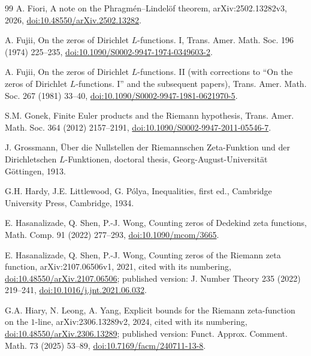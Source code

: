 \documentclass[11pt,a4paper]{article}
\numberwithin{equation}{section}
\theoremstyle{definition}
\theoremstyle{remark}
\begin{document}
\begin{thebibliography}{99}
 A. Fiori, A note on the Phragm\'en--Lindel\"of theorem, arXiv:2502.13282v3, 2026, \href{https://doi.org/10.48550/arXiv.2502.13282}{doi:10.48550/arXiv.2502.13282}.

 A. Fujii, On the zeros of Dirichlet $L$-functions. I, Trans. Amer. Math. Soc. 196 (1974) 225--235, \href{https://doi.org/10.1090/S0002-9947-1974-0349603-2}{doi:10.1090/S0002-9947-1974-0349603-2}.

 A. Fujii, On the zeros of Dirichlet $L$-functions. II (with corrections to ``On the zeros of Dirichlet $L$-functions. I'' and the subsequent papers), Trans. Amer. Math. Soc. 267 (1981) 33--40, \href{https://doi.org/10.1090/S0002-9947-1981-0621970-5}{doi:10.1090/S0002-9947-1981-0621970-5}.

 S.M. Gonek, Finite Euler products and the Riemann hypothesis, Trans. Amer. Math. Soc. 364 (2012) 2157--2191, \href{https://doi.org/10.1090/S0002-9947-2011-05546-7}{doi:10.1090/S0002-9947-2011-05546-7}.

 J. Grossmann, \"Uber die Nullstellen der Riemannschen Zeta-Funktion und der Dirichletschen $L$-Funktionen, doctoral thesis, Georg-August-Universit\"at G\"ottingen, 1913.

 G.H. Hardy, J.E. Littlewood, G. P\'olya, Inequalities, first ed., Cambridge University Press, Cambridge, 1934.

 E. Hasanalizade, Q. Shen, P.-J. Wong, Counting zeros of Dedekind zeta functions, Math. Comp. 91 (2022) 277--293, \href{https://doi.org/10.1090/mcom/3665}{doi:10.1090/mcom/3665}.

 E. Hasanalizade, Q. Shen, P.-J. Wong, Counting zeros of the Riemann zeta function, arXiv:2107.06506v1, 2021, cited with its numbering, \href{https://doi.org/10.48550/arXiv.2107.06506}{doi:10.48550/arXiv.2107.06506}; published version: J. Number Theory 235 (2022) 219--241, \href{https://doi.org/10.1016/j.jnt.2021.06.032}{doi:10.1016/j.jnt.2021.06.032}.

 G.A. Hiary, N. Leong, A. Yang, Explicit bounds for the Riemann zeta-function on the $1$-line, arXiv:2306.13289v2, 2024, cited with its numbering, \href{https://doi.org/10.48550/arXiv.2306.13289}{doi:10.48550/arXiv.2306.13289}; published version: Funct. Approx. Comment. Math. 73 (2025) 53--89, \href{https://doi.org/10.7169/facm/240711-13-8}{doi:10.7169/facm/240711-13-8}.


\end{thebibliography}
\end{document}

